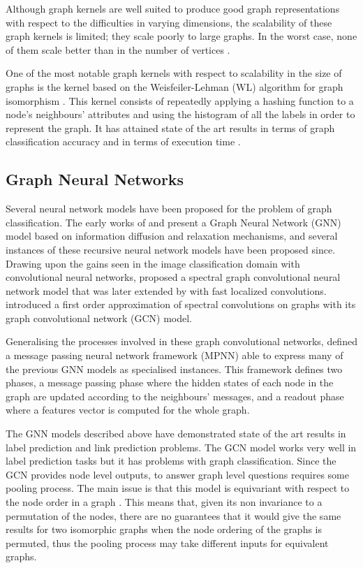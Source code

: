 \documentclass[conference]{IEEEtran}
\begin{document}
Although graph kernels are well suited to produce good graph representations with respect to the difficulties in varying dimensions, the scalability of these graph kernels is limited; they scale poorly to large graphs. In the worst case, none of them scale better than  in the number of vertices \cite{shervashidze2011weisfeiler}.

One of the most notable graph kernels with respect to scalability in
the size of graphs is the kernel based on the Weisfeiler-Lehman (WL) algorithm for graph isomorphism \cite{weisfeiler1968reduction}. This kernel consists of repeatedly applying a hashing function to a node's neighbours' attributes and using the histogram of all the labels in order to represent the graph. It has attained state of the art results in terms of graph classification accuracy and in terms of execution time \cite{shervashidze2011weisfeiler}.

\subsection{Graph Neural Networks}
Several neural network models have been proposed for the problem of graph classification. 
The early works of \cite{gori2005new} and \cite{scarselli2009graph} present a Graph Neural Network (GNN) model based on information diffusion and relaxation mechanisms, and several instances of these recursive neural network models have been proposed since. Drawing upon the gains seen in the image classification domain with convolutional neural networks, \cite{bruna2013spectral} proposed a spectral graph convolutional neural network model that was later extended by \cite{defferrard2016convolutional} with fast localized convolutions. \cite{kipf2016semi} introduced a first order approximation of spectral convolutions on graphs with its graph convolutional network (GCN) model.

Generalising the processes involved in these graph convolutional networks, \cite{gilmer2017neural} defined a message passing neural network framework (MPNN) able to express many of the previous GNN models as specialised instances.
This framework defines two phases, a message passing phase where the hidden states of each node in the graph are updated according to the neighbours' messages, and a readout phase where a features vector is computed for the whole graph.

The GNN models described above have demonstrated state of the art results in label prediction \cite{kipf2016semi} and link prediction \cite{schlichtkrull2018modeling} problems. The GCN model works very well in label prediction tasks but it has problems with graph classification. Since the GCN provides node level outputs, to answer graph level questions requires some pooling process.
The main issue is that this model is equivariant with respect to the node order in a  graph \cite{verma2018graph}. This means that, given its non invariance to a permutation of the nodes, there are no guarantees that it would give the same results for two isomorphic graphs when the node ordering of the graphs is permuted, thus the pooling process may take different inputs for equivalent graphs.
\end{document}

